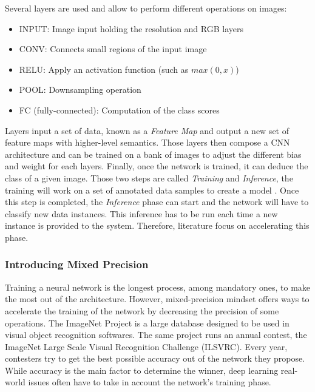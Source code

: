 Several layers are used and allow to perform different operations on images:
\begin{itemize}
  \item INPUT: Image input holding the resolution and RGB layers
  \item CONV: Connects small regions of the input image
  \item RELU: Apply an activation function (such as $max(0,x)$)
  \item POOL: Downsampling operation
  \item FC (fully-connected): Computation of the class scores
\end{itemize}

Layers input a set of data, known as a \emph{Feature Map} and output a new set of feature maps with higher-level semantics. Those layers then compose a CNN architecture and can be trained on a bank of images to adjust the different bias and weight for each layers. Finally, once the network is trained, it can deduce the class of a given image. Those two steps are called \emph{Training} and \emph{Inference}, the training will work on a set of annotated data samples to create a model  \cite{Abdelouahab2018}. Once this step is completed, the \emph{Inference} phase can start and the network will have to classify new data instances. This inference has to be run each time a new instance is provided to the system. Therefore, literature focus on accelerating this phase.


\subsubsection{Introducing Mixed Precision}

Training a neural network is the longest process, among mandatory ones, to make the most out of the architecture. However, mixed-precision mindset offers ways to accelerate the training of the network by decreasing the precision of some operations. The ImageNet Project \cite{ImageNet2009} is a large database designed to be used in visual object recognition softwares. The same project runs an annual contest, the ImageNet Large Scale Visual Recognition Challenge (ILSVRC). Every year, contesters try to get the best possible accuracy out of the network they propose. While accuracy is the main factor to determine the winner, deep learning real-world issues often have to take in account the network's training phase.

